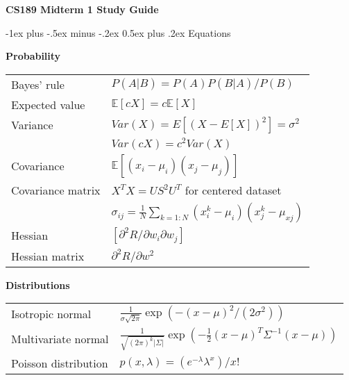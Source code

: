 \documentclass[10pt,landscape]{article}
\makeatletter
\renewcommand{\section}{\@startsection{section}{1}{0mm}%
                                {-1ex plus -.5ex minus -.2ex}%
                                {0.5ex plus .2ex}%
                                {\normalfont\large\bfseries}}
\makeatother
\begin{document}
\raggedright
\footnotesize
\begin{multicols}{3}


\setlength{\premulticols}{1pt}
\setlength{\postmulticols}{1pt}
\setlength{\multicolsep}{1pt}
\setlength{\columnsep}{2pt}

\begin{center}
\textbf{CS189 Midterm 1 Study Guide}
\end{center}



\section{Equations}

\textbf{Probability}

\begin{tabular}{@{}ll@{}}
Bayes' rule         & $P(A|B) = P(A)P(B|A) / P(B)$ \\
Expected value      & $\mathbb{E}[cX] = c\mathbb{E}[X]$ \\
Variance            & $Var(X) = E[(X-E[X])^2] = \sigma^2$ \\
                    & $Var(cX) = c^2 Var(X)$ \\
Covariance          & $\mathbb{E}[(x_i - \mu_i)(x_j - \mu_j)]$ \\
Covariance matrix   & $X^T X = US^2 U^T$ for centered dataset \\
                    & $\sigma_{ij} = \frac{1}{N}\sum_{k=1:N} (x_i^k - \mu_i)(x_j^k - \mu_{xj})$ \\
Hessian             & $[\partial^2 R / \partial w_i \partial w_j]$ \\
Hessian matrix      & $\partial^2 R / \partial w^2$
\end{tabular}

\textbf{Distributions}

\begin{tabular}{@{}ll@{}}
Isotropic normal        & $\frac{1}{\sigma \sqrt{2\pi}}\exp(-(x-\mu)^2 / (2\sigma^2))$ \\
Multivariate normal     & $\frac{1}{\sqrt{(2\pi)^k |\Sigma|}} \exp(-\frac{1}{2}(x-\mu)^T \Sigma^{-1}(x-\mu))$ \\
Poisson distribution    & $p(x, \lambda) = (e^{-\lambda}\lambda^x)/x!$ \\
\end{tabular}


\end{multicols}
\end{document}
